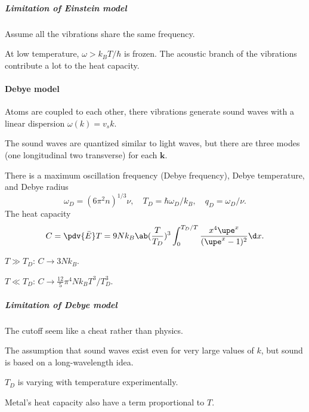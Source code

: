 \subparagraph{Limitation of Einstein model}

\begin{enumext}
  \item Assume all the vibrations share the same frequency.
  \item At low temperature, $\omega > k_BT/\hbar$ is frozen. The acoustic branch
  of the vibrations contribute a lot to the heat capacity.
\end{enumext}

\paragraph{Debye model}

\begin{enumext}
  \item Atoms are coupled to each other, there vibrations generate sound waves
  with a linear dispersion $\omega(k) = v_s k$.
  \item The sound waves are quantized similar to light waves, but there are
  three modes (one longitudinal two transverse) for each $\bm k$.
  \item There is a maximum oscillation frequency (Debye frequency), Debye
  temperature, and Debye radius
  \[
    \omega_D = (6\pi^2n)^{1/3} \nu,\quad
    T_D = \hbar\omega_D/k_B, \quad q_D = \omega_D/\nu.
  \]
  The heat capacity
  \[
    C = \pdv{\bar E}T
  = 9Nk_B\ab(\frac T{T_D})^3 \int_0^{T_D/T}
    \frac{x^4\upe^x}{(\upe^x - 1)^2} \d x.
  \]
  \begin{enumext}
    \item $T \gg T_D$: $C \to 3Nk_B$.
    \item $T \ll T_D$: $C \to \frac{12}{5}\pi^4 Nk_B T^3/T_D^3$.
  \end{enumext}
\end{enumext}

\subparagraph{Limitation of Debye model}

\begin{enumext}
  \item The cutoff seem like a cheat rather than physics.
  \item The assumption that sound waves exist even for very large values of $k$,
  but sound is based on a long-wavelength idea.
  \item $T_D$ is varying with temperature experimentally.
  \item Metal's heat capacity also have a term proportional
  to $T$.
\end{enumext}

